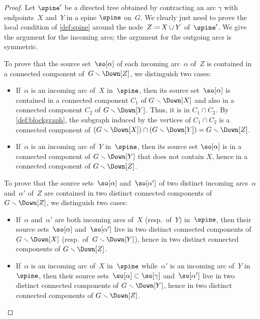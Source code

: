 \documentclass{amsart}
\theoremstyle{definition}
\newcommand{\ssm}{\smallsetminus} %
\newcommand{\eqdef}{\mbox{\,\raisebox{0.2ex}{\scriptsize\ensuremath{\mathrm:}}\ensuremath{=}\,}} %
\begin{document}
\begin{proof} 
  Let $\spine'$ be a directed tree obtained by contracting an arc $\gamma$ with endpoints~$X$ and~$Y$ in a spine $\spine$ on~$G$.
  We clearly just need to prove the local condition of \cref{def:spine} around the node~$Z \eqdef X \cup Y$ of~$\spine'$.
  We give the argument for the incoming arcs; the argument for the outgoing arcs is symmetric. 

  To prove that the source set~$\so[\alpha]$ of each incoming arc~$\alpha$ of~$Z$ is contained in a connected component of~$G \ssm \Down[Z]$, we distinguish two cases:
  \begin{itemize}
    \item If~$\alpha$ is an incoming arc of~$X$ in~$\spine$, then its source set~$\so[\alpha]$ is contained in a connected component $C_1$ of $G \ssm \Down[X]$ and also in a connected component $C_2$ of $G \ssm \Down[Y]$. Thus, it is in $C_1 \cap C_2$. By \cref{def:blockgraph}, the subgraph induced by the vertices of $C_1 \cap C_2$ is a connected component of $(G \ssm \Down[X]) \cap (G \ssm \Down[Y]) = G \ssm \Down[Z]$.
    \item If~$\alpha$ is an incoming arc of~$Y$ in~$\spine$, then its source set $\so[\alpha]$ is in a connected component of $G \ssm \Down[Y]$ that does not contain $X$, hence in a connected component of $G \ssm \Down[Z]$.
  \end{itemize}

  To prove that the source sets~$\so[\alpha]$ and~$\so[\alpha']$ of two distinct incoming arcs~$\alpha$ and~$\alpha'$ of~$Z$ are contained in two distinct connected components of~$G \ssm \Down[Z]$, we distinguish two cases:
  \begin{itemize}
    \item If~$\alpha$ and~$\alpha'$ are both incoming arcs of~$X$ (resp.~of~$Y$) in~$\spine$, then their source sets~$\so[\alpha]$ and~$\so[\alpha']$ live in two distinct connected components of $G \ssm \Down[X]$ (resp.~of~$G \ssm \Down[Y]$), hence in two distinct connected components of $G\ssm \Down[Z]$.
    \item If~$\alpha$ is an incoming arc of~$X$ in~$\spine$ while~$\alpha'$ is an incoming arc of~$Y$ in~$\spine$, then their source sets~$\so[\alpha] \subset \so[\gamma]$ and~$\so[\alpha']$ live in two distinct connected components of $G \ssm \Down[Y]$, hence in two distinct connected components of $G\ssm \Down[Z]$.
    \qedhere
  \end{itemize}
\end{proof}
\end{document}

